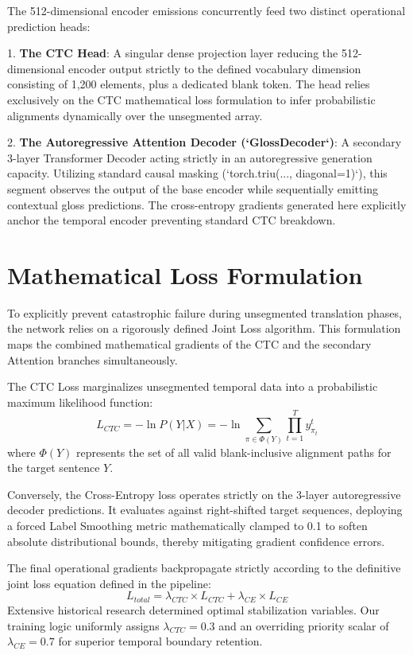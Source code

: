 The 512-dimensional encoder emissions concurrently feed two distinct operational prediction heads:

1. \textbf{The CTC Head}: A singular dense projection layer reducing the 512-dimensional encoder output strictly to the defined vocabulary dimension consisting of 1,200 elements, plus a dedicated blank token. The head relies exclusively on the CTC mathematical loss formulation to infer probabilistic alignments dynamically over the unsegmented array.
 
2. \textbf{The Autoregressive Attention Decoder (`GlossDecoder`)}: A secondary 3-layer Transformer Decoder acting strictly in an autoregressive generation capacity. Utilizing standard causal masking (`torch.triu(..., diagonal=1)`), this segment observes the output of the base encoder while sequentially emitting contextual gloss predictions. The cross-entropy gradients generated here explicitly anchor the temporal encoder preventing standard CTC breakdown.

\section{Mathematical Loss Formulation}

To explicitly prevent catastrophic failure during unsegmented translation phases, the network relies on a rigorously defined Joint Loss algorithm. This formulation maps the combined mathematical gradients of the CTC and the secondary Attention branches simultaneously.

The CTC Loss marginalizes unsegmented temporal data into a probabilistic maximum likelihood function:
\begin{equation}
L_{CTC} = -\ln P(Y|X) = -\ln \sum_{\pi \in \Phi(Y)} \prod_{t=1}^{T} y_{\pi_t}^t
\end{equation}
where $\Phi(Y)$ represents the set of all valid blank-inclusive alignment paths for the target sentence $Y$.

Conversely, the Cross-Entropy loss operates strictly on the 3-layer autoregressive decoder predictions. It evaluates against right-shifted target sequences, deploying a forced Label Smoothing metric mathematically clamped to 0.1 to soften absolute distributional bounds, thereby mitigating gradient confidence errors.

The final operational gradients backpropagate strictly according to the definitive joint loss equation defined in the pipeline:
\begin{equation}
L_{total} = \lambda_{CTC} \times L_{CTC} + \lambda_{CE} \times L_{CE}
\end{equation}
Extensive historical research \cite{camgoz2020sign} determined optimal stabilization variables. Our training logic uniformly assigns $\lambda_{CTC} = 0.3$ and an overriding priority scalar of $\lambda_{CE} = 0.7$ for superior temporal boundary retention.
